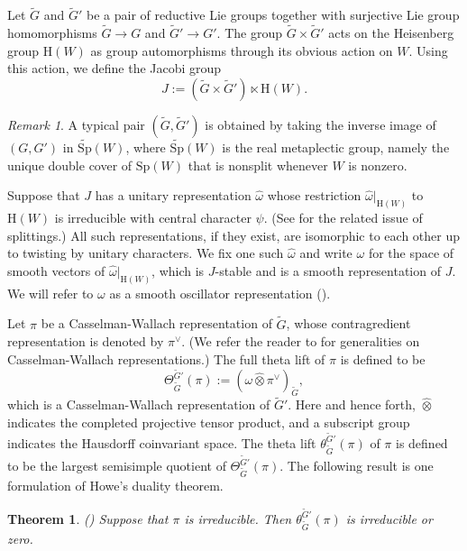 \documentclass[lang = american]{ems-icm} %
\def\Sp{{\mathrm{Sp}}}
\numberwithin{equation}{section}
\newtheorem{thm}{Theorem}[section]
\theoremstyle{remark}
\newtheorem*{remark}{Remark}
\begin{document}
Let $\widetilde G$ and $\widetilde G'$ be a pair of reductive Lie groups together with surjective Lie group homomorphisms $\widetilde G\rightarrow G$ and $\widetilde G'\rightarrow G'$.  The
group $\widetilde G\times \widetilde G'$ acts on the Heisenberg group $\mathrm{H}(W)$ as group automorphisms through its obvious action on $W$.
Using this action, we define the Jacobi group
\[
  J:=(\widetilde G\times \widetilde G')\ltimes \mathrm{H}(W).
\]

\begin{remark} A typical pair $(\widetilde G, \widetilde G')$ is obtained by taking the inverse image of $(G,G')$ in $\widetilde{\Sp}(W)$, where $\widetilde{\Sp}(W)$ is the real metaplectic group, namely the unique double cover of $\Sp(W)$ that is nonsplit whenever $W$ is nonzero.
\end{remark}

Suppose that $J$ has a unitary representation $\widehat \omega$ whose restriction $\widehat \omega|_{\mathrm{H}(W)}$ to $\mathrm{H}(W)$ is irreducible with central character $\psi$. (See \cite{Ku} for the related issue of splittings.) All such representations, if they exist, are isomorphic to each other up to twisting by unitary characters. We fix one such $\widehat \omega$ and write $\omega$ for the space of smooth vectors of $\widehat \omega|_{\mathrm{H}(W)}$, which is $J$-stable and is a smooth representation of $J$. We will refer to $\omega$ as a smooth oscillator representation (\cites{Wei,Ho1}).

Let $\pi$ be a Casselman-Wallach representation of $\widetilde G$, whose contragredient representation is denoted by $\pi^\vee$. (We refer the reader to \cite[Chapter 11]{Wa2} for generalities on Casselman-Wallach representations.) The full theta lift of $\pi$ is defined to be
\[
  \Theta_{\widetilde G}^{\widetilde G'}(\pi):=(\omega\widehat \otimes \pi^\vee)_{\widetilde G},
\]
which is a Casselman-Wallach representation of $\widetilde G'$.
Here and hence forth, $\widehat \otimes$ indicates the completed projective tensor product, and a subscript group indicates the Hausdorff coinvariant space.
The theta lift $\theta_{\widetilde G}^{\widetilde G'}(\pi)$ of $\pi$ is defined to be the largest semisimple quotient of $\Theta_{\widetilde G}^{\widetilde G'}(\pi)$.
The following result is one formulation of Howe's duality theorem.


\begin{thm}\label{howe}\emph{(\cite{Ho3})}
Suppose that $\pi$ is irreducible. Then $\theta_{\widetilde G}^{\widetilde G'}(\pi)$ is irreducible or zero.
\end{thm}
\end{document}
